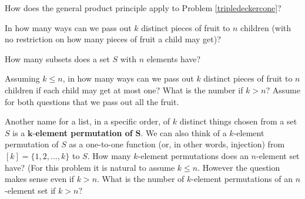 

\items How does the general product principle apply to Problem
\ref{tripledeckercone}?

\iteme In how many ways can we pass out $k$ distinct pieces of
fruit to
$n$ children (with no restriction on how many pieces of fruit a child may
get)?  

\iteme How many subsets does a set $S$ with $n$ elements have?

\itemm  Assuming $k\le n$, in how many ways can we pass out  $k$
distinct pieces of fruit to
$n$ children if each child may get at most one?  What is the number if
$k>n$?  Assume for both questions that we pass out all the fruit.


\iteme Another name for a list, in a specific order, of $k$ distinct things
chosen from a set $S$ is a  $\mathbf k$-{\bf element permutation of}
$\mathbf S$.  We can also think of a $k$-element permutation of $S$ as a
one-to-one function (or, in other words, injection) from
$[k]=\{1,2,\ldots, k\}$ to $S$.  How many $k$-element permutations does an
$n$-element set have?\label{kelementpermutation}  (For this problem it is
natural to assume $k\le n$.  However the question makes sense even if $k>n$. 
What is the number of $k$-element permutations of an $n$-element set if $k>n$?



